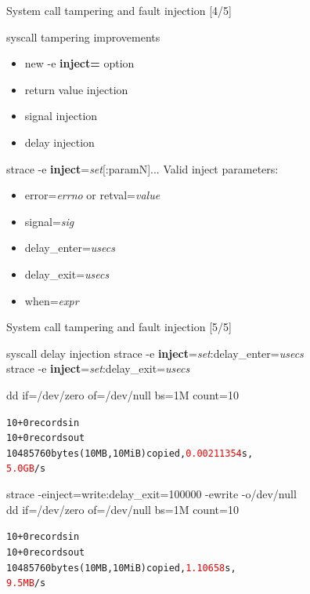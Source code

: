 \documentclass[unicode]{beamer}
\begin{document}
\begin{frame}[fragile]{System call tampering and fault injection \hfill [4/5]}
\begin{block}{\large syscall tampering improvements}
\begin{itemize}
	\item new -e \textbf{inject=} option
	\item return value injection
	\item signal injection
	\item delay injection
\end{itemize}
\end{block}

\begin{block}{\large strace -e \textbf{inject}=\textit{set}[:paramN]...}
Valid inject parameters:
\begin{itemize}
\item error=\textit{errno} or retval=\textit{value}
\item signal=\textit{sig}
\item delay\_enter=\textit{usecs}
\item delay\_exit=\textit{usecs}
\item when=\textit{expr}
\end{itemize}
\end{block}
\end{frame}

\begin{frame}[fragile]{System call tampering and fault injection \hfill [5/5]}
\begin{block}{\large syscall delay injection}
strace -e \textbf{inject}=\textit{set}:delay\_enter=\textit{usecs} \\
strace -e \textbf{inject}=\textit{set}:delay\_exit=\textit{usecs}
\end{block}

\begin{block}{dd if=/dev/zero of=/dev/null bs=1M count=10}
\begin{alltt}
10+0 records in
10+0 records out
10485760 bytes (10 MB, 10 MiB) copied, \textcolor{red}{0.00211354} s,
\textcolor{red}{5.0 GB}/s
\end{alltt}
\end{block}

\begin{block}{strace -einject=write:delay\_exit=100000 -ewrite -o/dev/null \\ dd if=/dev/zero of=/dev/null bs=1M count=10}
\begin{alltt}
10+0 records in
10+0 records out
10485760 bytes (10 MB, 10 MiB) copied, \textcolor{red}{1.10658} s,
\textcolor{red}{9.5 MB}/s
\end{alltt}
\end{block}
\end{frame}
\end{document}
